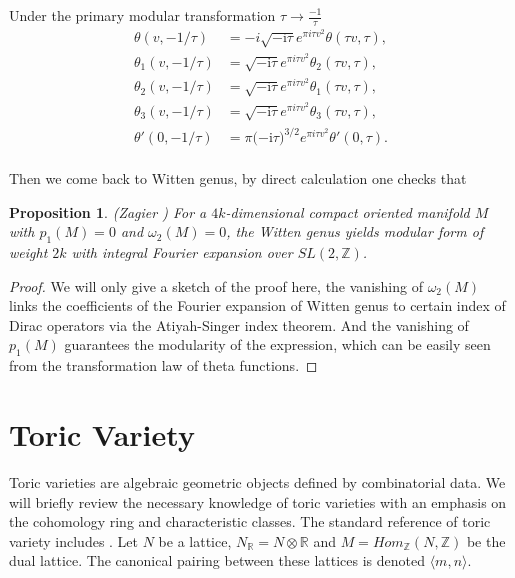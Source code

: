 \documentclass[11pt]{article}
\newtheorem{prop}[thm]{Proposition}
\newcommand{\intg}{\mathbb Z}
\begin{document}
Under the primary modular transformation $\tau\rightarrow \frac{-1}{\tau}$
\begin{equation*}
\begin{aligned}
	\theta \left(v,-1/\tau \right) & =-i\sqrt{-\text{i$\tau $}}e^{\pi  i \tau  v^2}\theta (\tau  v,\tau ),\\
	\theta_1 \left(v,-1/\tau \right) & =\sqrt{-\text{i$\tau $}}e^{\pi  i \tau  v^2}\theta_2 (\tau  v,\tau ),\\
	\theta_2 \left(v,-1/\tau \right) & =\sqrt{-\text{i$\tau $}}e^{\pi  i \tau  v^2}\theta_1 (\tau  v,\tau ),\\
	\theta_3 \left(v,-1/\tau \right) & =\sqrt{-\text{i$\tau $}}e^{\pi  i \tau  v^2}\theta_3 (\tau  v,\tau ),\\
	\theta' \left(0,-1/\tau \right) & =\pi (-\text{i$\tau $)}^{3/2}e^{\pi  i \tau  v^2}\theta' (0,\tau ).\\
\end{aligned}
\end{equation*}

Then we come back to Witten genus, by direct calculation one checks that
\begin{prop}
	(Zagier \cite{zagier1988note})
	For a $4k$-dimensional compact oriented manifold $M$ with $p_1(M)=0$ and $\omega_2(M)=0$, the Witten genus yields modular form of weight $2k$ with integral Fourier expansion over $SL(2,\intg)$.
\end{prop}
\begin{proof}
We will only give a sketch of the proof here, the vanishing of $\omega_2(M)$ links the coefficients of the Fourier expansion of Witten genus to certain index of Dirac operators via the Atiyah-Singer index theorem. And the vanishing of $p_1(M)$ guarantees the modularity of the expression, which can be easily seen from the transformation law of theta functions.
\end{proof}
\section{Toric Variety}
Toric varieties are algebraic geometric objects defined by combinatorial data. We will briefly review the necessary knowledge of toric varieties with an emphasis on the cohomology ring and characteristic classes. The standard reference of toric variety includes \cite{ewald2012combinatorial,cox2009toric}.
Let $N$ be a lattice, $N_\mathbb{R}=N\otimes\mathbb{R}$ and  $M=Hom_{\mathbb{Z}}(N,\mathbb{Z})$ be the dual lattice. The canonical pairing between these lattices is denoted $\langle m, n\rangle$.
\end{document}
